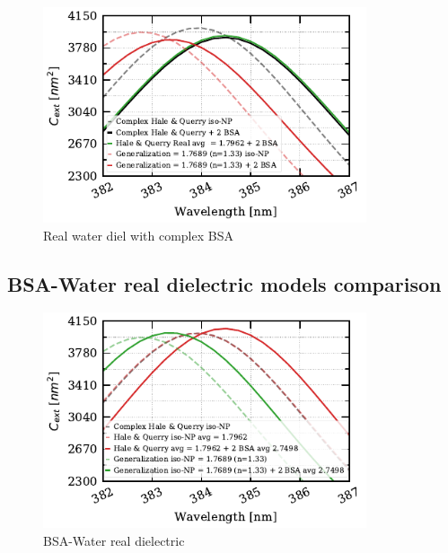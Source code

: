  \begin{figure} %
    \centering
    \includegraphics[width=0.85\textwidth]{bsa_w_real_water_diel.pdf} 
    \caption{Real water diel with complex BSA}
    \label{fig:real_w_comp_bsa}
 \end{figure}

 \subsection{BSA-Water real dielectric models comparison}

 \begin{figure} %
    \centering
    \includegraphics[width=0.85\textwidth]{bsa_phan_avg_real_water_diel.pdf} 
    \caption{BSA-Water real dielectric}
    \label{fig:bsa_w_real}
 \end{figure}

 